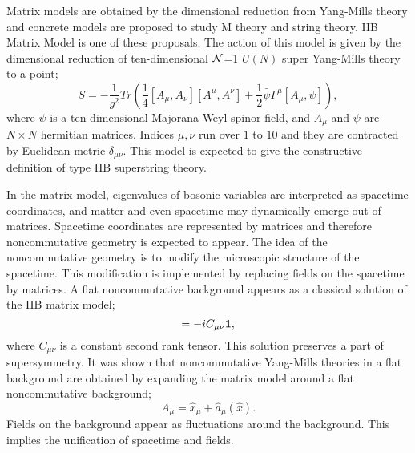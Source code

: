 \documentclass[a4paper,11pt]{article}
\begin{document}
Matrix models are obtained by the dimensional 
reduction from Yang-Mills theory and 
concrete models\cite{BFSS,IKKT} are proposed to study 
M theory and string theory. 
IIB Matrix Model\cite{IKKT} is one of these proposals.
The action of this model is given by the dimensional reduction 
of ten-dimensional $\cal{N}$=1 $U(N)$ super Yang-Mills theory 
to a point; 
\begin{equation}
 S= -\frac{1}{g^{2}} Tr \left( \frac{1}{4} \left[ A_{\mu} ,A_{\nu}\right] 
         \left[A^{\mu} ,A^{\nu} \right]  
  +\frac{1}{2}\bar{\psi } \Gamma^{\mu} \left[ A_{\mu},\psi \right] \right) , 
\end{equation}
where $\psi$ is a ten dimensional Majorana-Weyl spinor field, 
and $A_{\mu}$ and $\psi$ are $N \times N$ hermitian matrices. 
Indices $\mu,\nu$ run over $1$ to $10$ and they are contracted by 
Euclidean metric $\delta_{\mu\nu}$. 
This model is expected to give the constructive definition of 
type IIB superstring theory\cite{AIKKTT}. 

In the matrix model, eigenvalues of 
bosonic variables are interpreted as spacetime 
coordinates, and matter and even spacetime may 
dynamically emerge out of matrices\cite{AIKKTT,AIKKT}. 
Spacetime coordinates are represented  
by matrices and therefore noncommutative geometry 
is expected to appear. 
The idea of the noncommutative geometry 
is to modify the microscopic structure of the spacetime. 
This modification is implemented by replacing fields 
on the spacetime by matrices. 
A flat noncommutative background appears 
as a classical solution of the IIB matrix model; 
\begin{equation} 
[\hat{x}_{\mu},\hat{x}_{\nu}]=-iC_{\mu\nu}{\bf 1}, 
\label{heisenberg} 
\end{equation} 
where $C_{\mu\nu}$ is a constant second rank tensor. 
This solution preserves a part of supersymmetry. 
It was shown\cite{Li,AIIKKT} that 
noncommutative Yang-Mills theories in a flat background  
are obtained by 
expanding the matrix model around 
a flat noncommutative background; 
\begin{equation}
A_{\mu}=\hat{x}_{\mu}+\hat{a}_{\mu}(\hat{x}). 
\label{expansion}
\end{equation}
Fields on the background appear as 
fluctuations around the background. 
This implies  
the unification of spacetime and fields. 
\end{document}

